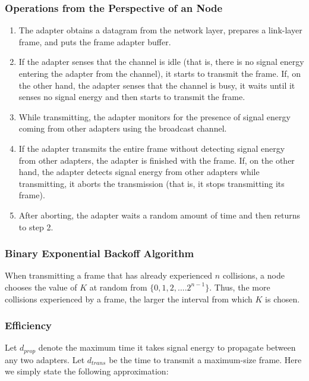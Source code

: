 \documentclass[11pt]{article}
\begin{document}
\subsubsection{Operations from the Perspective of an Node}

\begin{enumerate}

	\item The adapter obtains a datagram from the network layer, prepares a link-layer frame, and puts the frame adapter buffer.
	\item If the adapter senses that the channel is idle (that is, there is no signal energy entering the adapter from the channel), it starts to transmit the frame. If, on the other hand, the adapter senses that the channel is busy, it waits until it senses no signal energy and then starts to transmit the frame.
	
	\item While transmitting, the adapter monitors for the presence of signal energy coming from other adapters using the broadcast channel.
	
	\item If the adapter transmits the entire frame without detecting signal energy from other adapters, the adapter is finished with the frame. If, on the other hand, the adapter detects signal energy from other adapters while transmitting, it aborts the transmission (that is, it stops transmitting its frame).
	
	\item After aborting, the adapter waits a random amount of time and then returns to step 2.
\end{enumerate}

\subsubsection{Binary Exponential Backoff Algorithm}
When transmitting a frame that has already experienced $n$ collisions, a node chooses the value of $K$ at random from $\{0,1,2, . . . . 2^{n-1}\}$. Thus, the more collisions experienced by a frame, the larger the interval from which $K$ is chosen.

\subsubsection{Efficiency}

Let $d_{prop}$ denote the maximum time it takes signal energy to propagate between any two adapters. Let $d_{trans}$ be the time to transmit a maximum-size frame. Here we simply state the following approximation:
\end{document}
